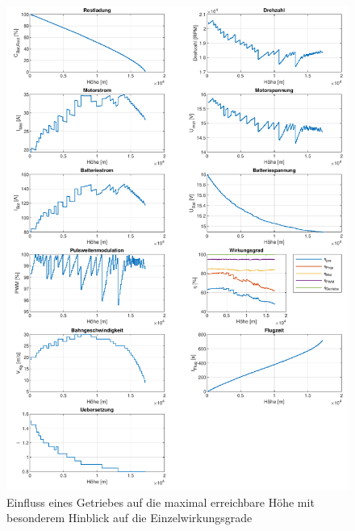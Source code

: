 \begin{appendix}
\begin{figure}[H]
\centering
	\includegraphics[scale=0.7]{Diagramme/Getriebe_wirkungsgrade.pdf}
	\caption{Einfluss eines Getriebes auf die maximal erreichbare Höhe mit besonderem Hinblick auf die Einzelwirkungsgrade}
	\label{abb:getriebe_wirkungsgrade}
\end{figure}




\end{appendix}
